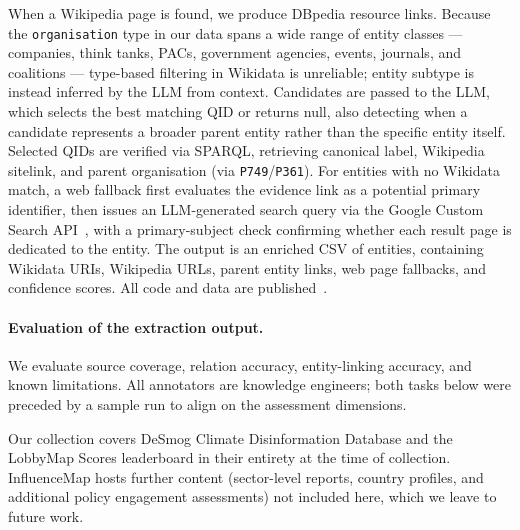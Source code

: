 When a Wikipedia page is found, we produce DBpedia resource links.
Because the \texttt{organisation} type in our data spans a wide range of entity classes — companies, think tanks, PACs, government agencies, events, journals, and coalitions — type-based filtering in Wikidata is unreliable; entity subtype is instead inferred by the LLM from context.
Candidates are passed to the LLM, which selects the best matching QID or returns null, also detecting when a candidate represents a broader parent entity rather than the specific entity itself.
Selected QIDs are verified via SPARQL, retrieving canonical label, Wikipedia sitelink, and parent organisation (via \texttt{P749}/\texttt{P361}).
For entities with no Wikidata match, a web fallback first evaluates the evidence link as a potential primary identifier, then issues an LLM-generated search query via the Google Custom Search API~\cite{googlecse}, with a primary-subject check confirming whether each result page is dedicated to the entity.
The output is an enriched CSV of entities, containing Wikidata URIs, Wikipedia URLs, parent entity links, web page fallbacks, and confidence scores. All code and data are published~\cite{lack-el}.

\paragraph{Evaluation of the extraction output.}
We evaluate source coverage, relation accuracy, entity-linking accuracy, and known limitations.
All annotators are knowledge engineers; both tasks below were preceded by a sample run to align on the assessment dimensions.

Our collection covers DeSmog Climate Disinformation Database and the LobbyMap Scores leaderboard in their entirety at the time of collection.
InfluenceMap hosts further content (sector-level reports, country profiles, and additional policy engagement assessments) not included here, which we leave to future work.


